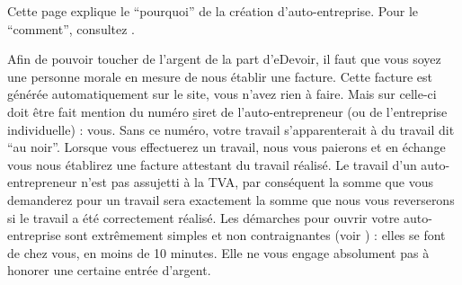 ﻿Cette page explique le “pourquoi” de la création d’auto-entreprise. Pour le “comment”, consultez .

Afin de pouvoir toucher de l’argent de la part d’eDevoir, il faut que vous soyez une personne morale en mesure de nous établir une facture. Cette facture est générée automatiquement sur le site, vous n’avez rien à faire. Mais sur celle-ci doit être fait mention du numéro \b{siret} de l’auto-entrepreneur (ou de l’entreprise individuelle) : vous. Sans ce numéro, votre travail s'apparenterait à du travail dit “au noir”. Lorsque vous effectuerez un travail, nous vous paierons et en échange vous nous établirez une facture attestant du travail réalisé. Le travail d’un auto-entrepreneur n’est pas assujetti à la TVA, par conséquent la somme que vous demanderez pour un travail sera exactement la somme que nous vous reverserons si le travail a été correctement réalisé.
Les démarches pour ouvrir votre auto-entreprise sont extrêmement simples et non contraignantes (voir ) : elles se font de chez vous, en moins de 10 minutes. Elle ne vous engage absolument pas à honorer une certaine entrée d’argent.